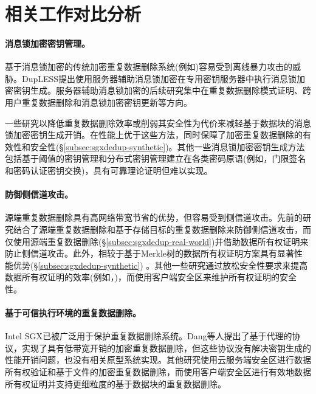 \section{相关工作对比分析}
\label{sec:sgxdedup-related_work}

\paragraph*{消息锁加密密钥管理。} 基于消息锁加密的传统加密重复数据删除系统(例如)容易受到离线暴力攻击的威胁。DupLESS提出使用服务器辅助消息锁加密在专用密钥服务器中执行消息锁加密密钥生成。服务器辅助消息锁加密的后续研究集中在重复数据删除模式证明、跨用户重复数据删除和消息锁加密密钥更新等方向。

一些研究以降低重复数据删除效率或削弱其安全性为代价来减轻基于数据块的消息锁加密密钥生成开销。\sysnameS 在性能上优于这些方法，同时保障了加密重复数据删除的有效性和安全性(\S\ref{subsec:sgxdedup-synthetic})。其他一些消息锁加密密钥生成方法包括基于阈值的密钥管理和分布式密钥管理建立在各类密码原语(例如，门限签名和密码认证密钥交换)，具有可靠理论证明但难以实现。

\paragraph*{防御侧信道攻击。}源端重复数据删除具有高网络带宽节省的优势，但容易受到侧信道攻击。先前的研究结合了源端重复数据删除和基于存储目标的重复数据删除来防御侧信道攻击，而\sysnameS 仅使用源端重复数据删除(\S\ref{subsec:sgxdedup-real-world})并借助数据所有权证明来防止侧信道攻击。此外，\sysnameS 相较于基于Merkle树的数据所有权证明方案具有显著性能优势(\S\ref{subsec:sgxdedup-synthetic}) 。其他一些研究通过放松安全性要求来提高数据所有权证明的效率(例如，)，而\sysnameS 使用客户端安全区来维护所有权证明的安全性。

\paragraph*{基于可信执行环境的重复数据删除。} Intel SGX已被广泛用于保护重复数据删除系统。Dang等人提出了基于代理的协议，实现了具有低带宽开销的加密重复数据删除，但这些协议没有解决密钥生成的性能开销问题，也没有相关原型系统实现。其他研究使用云服务端安全区进行数据所有权验证和基于文件的加密重复数据删除，而\sysnameS 使用客户端安全区进行有效地数据所有权证明并支持更细粒度的基于数据块的重复数据删除。
